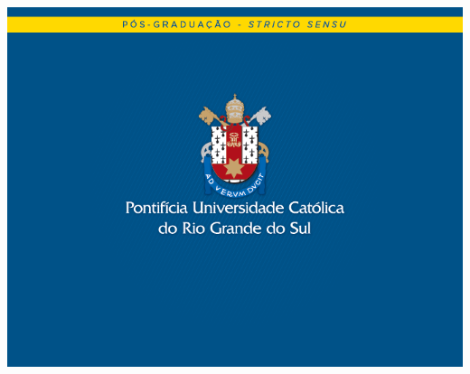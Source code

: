 \documentclass[
	12pt,		%
    openright, 	%
    oneside,	%
    a4paper,	%
	french,				%
	spanish,			%
	english,				%
    brazil,				%
]{abntex2}
\begin{document}
{{}

\vfill

\noindent\includegraphics[width=\textwidth]{fundomestradodoutorado_baixo}

\clearpage
\restoregeometry
}



\imprimirfolhaderosto*


\end{document}
